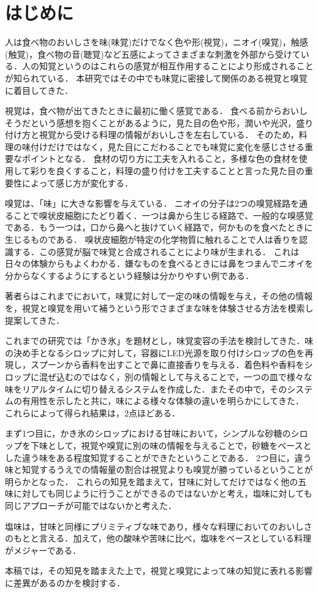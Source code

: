\section{はじめに}
\label{sec:start}

人は食べ物のおいしさを味(味覚)だけでなく色や形(視覚)，ニオイ(嗅覚)，触感(触覚)，食べ物の音(聴覚)など五感によってさまざまな刺激を外部から受けている．人の知覚というのはこれらの感覚が相互作用することにより形成されることが知られている．
本研究ではその中でも味覚に密接して関係のある視覚と嗅覚に着目してきた．

視覚は，食べ物が出てきたときに最初に働く感覚である．
食べる前からおいしそうだという感想を抱くことがあるように，見た目の色や形，潤いや光沢，盛り付け方と視覚から受ける料理の情報がおいしさを左右している．
そのため，料理の味付けだけではなく，見た目にこだわることでも味覚に変化を感じさせる重要なポイントとなる．
食材の切り方に工夫を入れること，多様な色の食材を使用して彩りを良くすること，料理の盛り付けを工夫することと言った見た目の重要性によって感じ方が変化する．

嗅覚は、「味」に大きな影響を与えている．
ニオイの分子は2つの嗅覚経路を通ることで嗅状皮細胞にたどり着く．一つは鼻から生じる経路で、一般的な嗅感覚である．もう一つは，口から鼻へと抜けていく経路で，何かものを食べたときに生じるものである．
嗅状皮細胞が特定の化学物質に触れることで人は香りを認識する．この感覚が脳で味覚と合成されることにより味が生まれる．
これは日々の体験からもよくわかる．嫌なものを食べるときには鼻をつまんでニオイを分からなくするようにするという経験は分かりやすい例である．


著者らはこれまでにおいて，味覚に対して一定の味の情報を与え，その他の情報を，視覚と嗅覚を用いて補うという形でさまざまな味を体験させる方法を模索し提案してきた．

これまでの研究\cite{fan}\cite{pomp}では「かき氷」を題材とし，味覚変容の手法を検討してきた．味の決め手となるシロップに対して，容器にLED光源を取り付けシロップの色を再現し，スプーンから香料を出すことで鼻に直接香りを与える．着色料や香料をシロップに混ぜ込むのではなく，別の情報として与えることで，一つの皿で様々な味をリアルタイムに切り替えるシステムを作成した．またその中で，そのシステムの有用性を示したと共に，味による様々な体験の違いを明らかにしてきた．
これらによって得られ結果は，2点ほどある．

まず1つ目に，かき氷のシロップにおける甘味において，シンプルな砂糖のシロップを下味として，視覚や嗅覚に別の味の情報を与えることで，砂糖をベースとした違う味をある程度知覚することができたということである．
2つ目に，違う味と知覚するうえでの情報量の割合は視覚よりも嗅覚が勝っているということが明らかとなった．
これらの知見を踏まえて，甘味に対してだけではなく他の五味に対しても同じように行うことができるのではないかと考え，塩味に対しても同じアプローチが可能ではないかと考えた．

塩味は，甘味と同様にプリミティブな味であり，様々な料理においてのおいしさのもとと言える．加えて，他の酸味や苦味に比べ，塩味をベースとしている料理がメジャーである．





本稿では，その知見を踏まえた上で，視覚と嗅覚によって味の知覚に表れる影響に差異があるのかを検討する．
